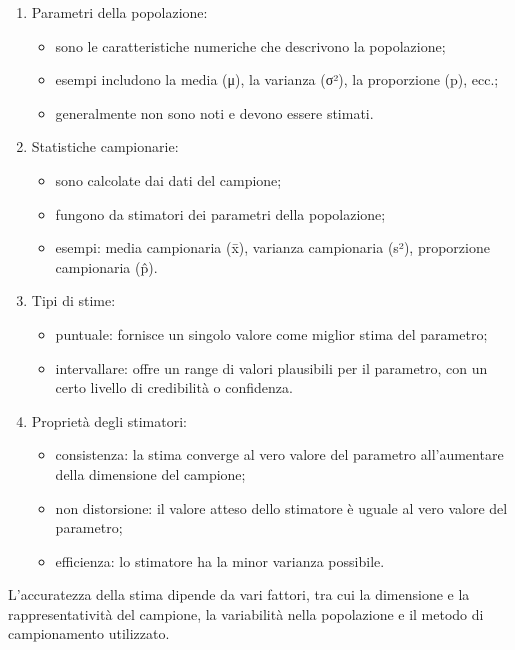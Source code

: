 \documentclass[
  letterpaper,
  krantz2]{{[}./krantz{]}}
\providecommand{\tightlist}{%
  \setlength{\itemsep}{0pt}\setlength{\parskip}{0pt}}\usepackage{longtable,booktabs,array}
\begin{document}
\begin{enumerate}
\def\labelenumi{\arabic{enumi}.}
\item
  Parametri della popolazione:

  \begin{itemize}
  \tightlist
  \item
    sono le caratteristiche numeriche che descrivono la popolazione;
  \item
    esempi includono la media (μ), la varianza (σ²), la proporzione (p),
    ecc.;
  \item
    generalmente non sono noti e devono essere stimati.
  \end{itemize}
\item
  Statistiche campionarie:

  \begin{itemize}
  \tightlist
  \item
    sono calcolate dai dati del campione;
  \item
    fungono da stimatori dei parametri della popolazione;
  \item
    esempi: media campionaria (x̄), varianza campionaria (s²),
    proporzione campionaria (p̂).
  \end{itemize}
\item
  Tipi di stime:

  \begin{itemize}
  \tightlist
  \item
    puntuale: fornisce un singolo valore come miglior stima del
    parametro;
  \item
    intervallare: offre un range di valori plausibili per il parametro,
    con un certo livello di credibilità o confidenza.
  \end{itemize}
\item
  Proprietà degli stimatori:

  \begin{itemize}
  \tightlist
  \item
    consistenza: la stima converge al vero valore del parametro
    all'aumentare della dimensione del campione;
  \item
    non distorsione: il valore atteso dello stimatore è uguale al vero
    valore del parametro;
  \item
    efficienza: lo stimatore ha la minor varianza possibile.
  \end{itemize}
\end{enumerate}

L'accuratezza della stima dipende da vari fattori, tra cui la dimensione
e la rappresentatività del campione, la variabilità nella popolazione e
il metodo di campionamento utilizzato.
\end{document}
